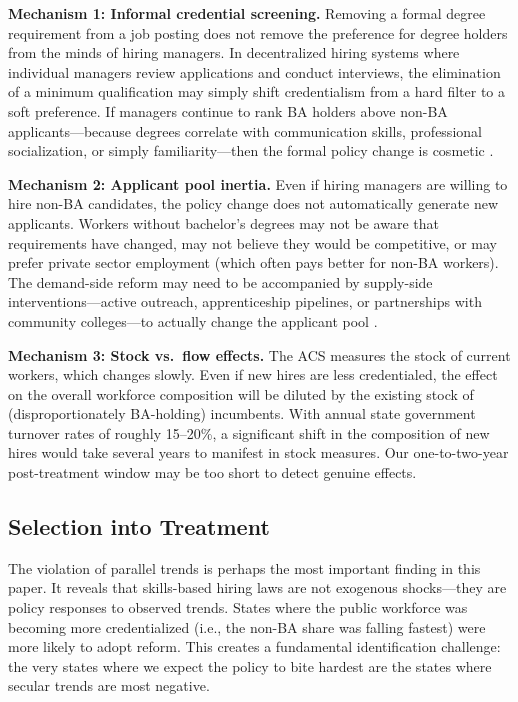 \documentclass[12pt]{article}
\begin{document}
\textbf{Mechanism 1: Informal credential screening.} Removing a formal degree requirement from a job posting does not remove the preference for degree holders from the minds of hiring managers. In decentralized hiring systems where individual managers review applications and conduct interviews, the elimination of a minimum qualification may simply shift credentialism from a hard filter to a soft preference. If managers continue to rank BA holders above non-BA applicants---because degrees correlate with communication skills, professional socialization, or simply familiarity---then the formal policy change is cosmetic \citep{Rivera2012, FullerSarvestani2022}.

\textbf{Mechanism 2: Applicant pool inertia.} Even if hiring managers are willing to hire non-BA candidates, the policy change does not automatically generate new applicants. Workers without bachelor's degrees may not be aware that requirements have changed, may not believe they would be competitive, or may prefer private sector employment (which often pays better for non-BA workers). The demand-side reform may need to be accompanied by supply-side interventions---active outreach, apprenticeship pipelines, or partnerships with community colleges---to actually change the applicant pool \citep{Holzer2021}.

\textbf{Mechanism 3: Stock vs.\ flow effects.} The ACS measures the stock of current workers, which changes slowly. Even if new hires are less credentialed, the effect on the overall workforce composition will be diluted by the existing stock of (disproportionately BA-holding) incumbents. With annual state government turnover rates of roughly 15--20\%, a significant shift in the composition of new hires would take several years to manifest in stock measures. Our one-to-two-year post-treatment window may be too short to detect genuine effects.

\subsection{Selection into Treatment}

The violation of parallel trends is perhaps the most important finding in this paper. It reveals that skills-based hiring laws are not exogenous shocks---they are policy responses to observed trends. States where the public workforce was becoming more credentialized (i.e., the non-BA share was falling fastest) were more likely to adopt reform. This creates a fundamental identification challenge: the very states where we expect the policy to bite hardest are the states where secular trends are most negative.
\end{document}
